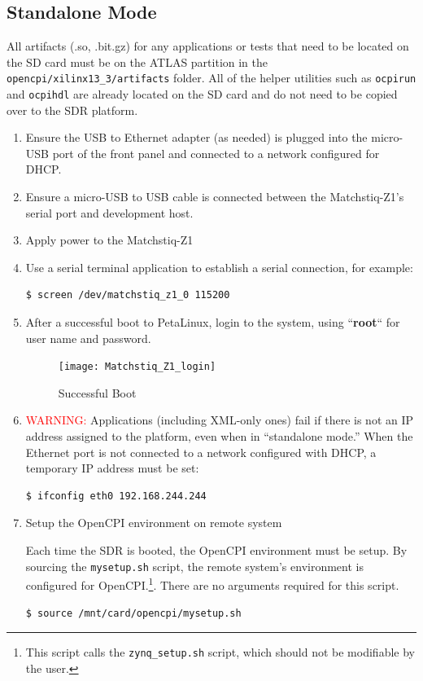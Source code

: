 \pagebreak
\subsection{Standalone Mode}
All artifacts (.so, .bit.gz) for any applications or tests that need to be located on the SD card must be on the ATLAS partition in the \texttt{opencpi/xilinx13\_3/artifacts} folder.  All of the helper utilities such as \texttt{ocpirun} and \texttt{ocpihdl} are already located on the SD card and do not need to be copied over to the SDR platform.

\begin{enumerate}
\item Ensure the USB to Ethernet adapter (as needed) is plugged into the micro-USB port of the front panel and connected to a network configured for DHCP. \item Ensure a micro-USB to USB cable is connected between the Matchstiq-Z1's serial port and development host.
\item Apply power to the Matchstiq-Z1
\item Use a serial terminal application to establish a serial connection, for example:

\begin{verbatim}
$ screen /dev/matchstiq_z1_0 115200
\end{verbatim} \medskip

\item After a successful boot to PetaLinux, login to the system, using  ``\textbf{root}`` for user name and password.

\begin{figure}[H]
	\centerline{\texttt{[image: Matchstiq\_Z1\_login]}}
	\caption{Successful Boot}
	\label{fig:boot2}
\end{figure}

\item \textcolor{red}{WARNING:}
Applications (including XML-only ones) fail if there is not an IP address assigned to the platform, even when in ``standalone mode.'' When the Ethernet port is not connected to a network configured with DHCP, a temporary IP address must be set:
\begin{verbatim}
$ ifconfig eth0 192.168.244.244
\end{verbatim} \medskip

\item Setup the OpenCPI environment on remote system

Each time the SDR is booted, the OpenCPI environment must be setup. By sourcing the \texttt{mysetup.sh} script, the remote system's environment is configured for OpenCPI.\footnote{This script calls the \texttt{zynq\_setup.sh} script, which should not be modifiable by the user.}. There are no arguments required for this script.
\begin{verbatim}
$ source /mnt/card/opencpi/mysetup.sh
\end{verbatim} \medskip


\end{enumerate}
